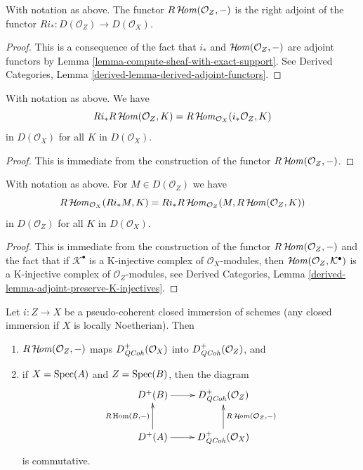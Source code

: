 \begin{lemma}
\label{lemma-sheaf-with-exact-support-adjoint}
With notation as above. The functor $R\mathop{\mathcal{H}\!\mathit{om}}\nolimits(\mathcal{O}_Z, -)$
is the right adjoint of the functor
$Ri_* : D(\mathcal{O}_Z) \to D(\mathcal{O}_X)$.
\end{lemma}

\begin{proof}
This is a consequence of the fact that $i_*$ and
$\mathop{\mathcal{H}\!\mathit{om}}\nolimits(\mathcal{O}_Z, -)$ are adjoint functors by
Lemma \ref{lemma-compute-sheaf-with-exact-support}. See
Derived Categories, Lemma \ref{derived-lemma-derived-adjoint-functors}.
\end{proof}

\begin{lemma}
\label{lemma-sheaf-with-exact-support-ext}
With notation as above. We have
$$
Ri_*R\mathop{\mathcal{H}\!\mathit{om}}\nolimits(\mathcal{O}_Z, K) =
R\mathop{\mathcal{H}\!\mathit{om}}\nolimits_{\mathcal{O}_X}(i_*\mathcal{O}_Z, K)
$$
in $D(\mathcal{O}_X)$ for all $K$ in $D(\mathcal{O}_X)$.
\end{lemma}

\begin{proof}
This is immediate from the construction of the functor
$R\mathop{\mathcal{H}\!\mathit{om}}\nolimits(\mathcal{O}_Z, -)$.
\end{proof}

\begin{lemma}
\label{lemma-sheaf-with-exact-support-internal-home}
With notation as above. For $M \in D(\mathcal{O}_Z)$ we have
$$
R\mathop{\mathcal{H}\!\mathit{om}}\nolimits_{\mathcal{O}_X}(Ri_*M, K) =
Ri_*R\mathop{\mathcal{H}\!\mathit{om}}\nolimits_{\mathcal{O}_Z}(M, R\mathop{\mathcal{H}\!\mathit{om}}\nolimits(\mathcal{O}_Z, K))
$$
in $D(\mathcal{O}_Z)$ for all $K$ in $D(\mathcal{O}_X)$.
\end{lemma}

\begin{proof}
This is immediate from the construction of the functor
$R\mathop{\mathcal{H}\!\mathit{om}}\nolimits(\mathcal{O}_Z, -)$ and the fact that if
$\mathcal{K}^\bullet$ is a K-injective complex of
$\mathcal{O}_X$-modules, then $\mathop{\mathcal{H}\!\mathit{om}}\nolimits(\mathcal{O}_Z, \mathcal{K}^\bullet)$
is a K-injective complex of $\mathcal{O}_Z$-modules, see
Derived Categories, Lemma \ref{derived-lemma-adjoint-preserve-K-injectives}.
\end{proof}

\begin{lemma}
\label{lemma-sheaf-with-exact-support-quasi-coherent}
Let $i : Z \to X$ be a pseudo-coherent closed immersion of schemes
(any closed immersion if $X$ is locally Noetherian).
Then
\begin{enumerate}
\item $R\mathop{\mathcal{H}\!\mathit{om}}\nolimits(\mathcal{O}_Z, -)$ maps $D^+_{\mathit{QCoh}}(\mathcal{O}_X)$
into $D^+_{\mathit{QCoh}}(\mathcal{O}_Z)$, and
\item if $X = \mathop{\mathrm{Spec}}(A)$ and $Z = \mathop{\mathrm{Spec}}(B)$, then the diagram
$$
\xymatrix{
D^+(B) \ar[r] & D_\QCoh^+(\mathcal{O}_Z) \\
D^+(A) \ar[r] \ar[u]^{R\Hom(B, -)} &
D_\QCoh^+(\mathcal{O}_X) \ar[u]_{R\SheafHom(\mathcal{O}_Z, -)}
}
$$
is commutative.
\end{enumerate}
\end{lemma}

